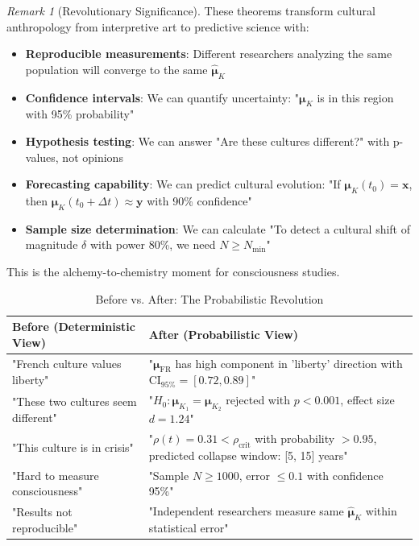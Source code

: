 \documentclass[11pt,a4paper]{article}
\theoremstyle{definition}
\theoremstyle{remark}
\newtheorem{remark}{Remark}[section]
\begin{document}
\begin{remark}[Revolutionary Significance]
These theorems transform cultural anthropology from interpretive art to predictive science with:
\begin{itemize}
\item \textbf{Reproducible measurements}: Different researchers analyzing the same population will converge to the same \(\hat{\boldsymbol{\mu}}_K\)
\item \textbf{Confidence intervals}: We can quantify uncertainty: "\(\boldsymbol{\mu}_K\) is in this region with 95\% probability"
\item \textbf{Hypothesis testing}: We can answer "Are these cultures different?" with p-values, not opinions
\item \textbf{Forecasting capability}: We can predict cultural evolution: "If \(\boldsymbol{\mu}_K(t_0) = \mathbf{x}\), then \(\boldsymbol{\mu}_K(t_0+\Delta t) \approx \mathbf{y}\) with 90\% confidence"
\item \textbf{Sample size determination}: We can calculate "To detect a cultural shift of magnitude \(\delta\) with power 80\%, we need \(N \geq N_{\min}\)"
\end{itemize}

This is the alchemy-to-chemistry moment for consciousness studies.
\end{remark}

\begin{table}[H]
\centering
\caption{Before vs. After: The Probabilistic Revolution}
\label{tab:before_after_probability}
\begin{tabular}{|p{6cm}|p{7cm}|}
\hline
\textbf{Before (Deterministic View)} & \textbf{After (Probabilistic View)} \\
\hline
"French culture values liberty" & "\(\boldsymbol{\mu}_{\text{FR}}\) has high component in 'liberty' direction with \(\text{CI}_{95\%} = [0.72, 0.89]\)" \\
\hline
"These two cultures seem different" & "\(H_0: \boldsymbol{\mu}_{K_1} = \boldsymbol{\mu}_{K_2}\) rejected with \(p < 0.001\), effect size \(d=1.24\)" \\
\hline
"This culture is in crisis" & "\(\rho(t) = 0.31 < \rho_{\text{crit}}\) with probability \(>0.95\), predicted collapse window: [5, 15] years" \\
\hline
"Hard to measure consciousness" & "Sample \(N \geq 1000\), error \(\leq 0.1\) with confidence 95\%" \\
\hline
"Results not reproducible" & "Independent researchers measure same \(\hat{\boldsymbol{\mu}}_K\) within statistical error" \\
\hline
\end{tabular}
\end{table}
\end{document}
